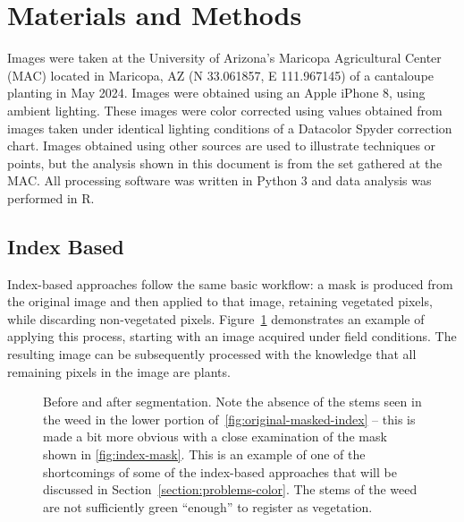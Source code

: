 \documentclass[agriculture,article,submit,pdftex,moreauthors]{Definitions/mdpi}
\begin{document}
%
%
%



\section{Materials and Methods}
Images were taken at the University of Arizona's Maricopa Agricultural Center (MAC) located in Maricopa, AZ (N 33.061857, E 111.967145) of a cantaloupe planting in May 2024. Images were obtained using an Apple iPhone 8, using ambient lighting. These images were color corrected using values obtained from images taken under identical lighting conditions of a Datacolor Spyder correction chart.  Images obtained using other sources are used to illustrate techniques or points, but the analysis shown in this document is from the set gathered at the MAC. All processing software was written in Python 3 and data analysis was performed in R.  

\subsection{Index Based}
Index-based approaches follow the same basic workflow: a mask is produced from the original image and then applied to that image, retaining vegetated pixels, while discarding non-vegetated pixels. Figure~\ref{fig:index-segmentation} demonstrates an example of applying this process, starting with an image acquired under field conditions. The resulting image can be subsequently processed with the knowledge that all remaining pixels in the image are plants.

\begin{figure}[H]
	\centering
	\hfill
	\hfill
	\caption[Before and after segmentation]{Before and after segmentation. Note the absence of the stems seen in the weed in the lower portion of~\ref{fig:original-masked-index} -- this is made a bit more obvious with a close examination of the mask shown in \ref{fig:index-mask}.  This is an example of one of the shortcomings of some of the index-based approaches that will be discussed in Section~\ref{section:problems-color}. The stems of the weed are not sufficiently green ``enough'' to register as vegetation.}
	\label{fig:index-segmentation}
\end{figure}
\end{document}

